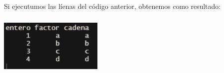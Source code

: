 \documentclass{article}
\begin{document}
\\Si ejecutumos las líenas del código anterior, obtenemos como resultado:\\ 

\begin{center}
    

    \includegraphics[width=5cm, height=3cm]{dta.png}\\
    
\end{center}
\end{document}
